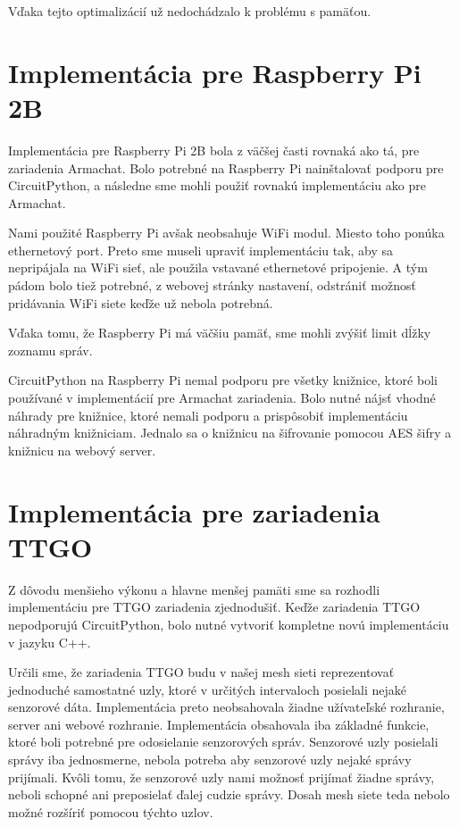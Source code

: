 \documentclass[slovak,master]{diploma}
\begin{document}
Vďaka tejto optimalizácií už nedochádzalo k problému s pamäťou.

\section{Implementácia pre Raspberry Pi 2B}
Implementácia pre Raspberry Pi 2B bola z väčšej časti rovnaká ako tá, pre zariadenia Armachat. Bolo potrebné na Raspberry Pi nainštalovať podporu pre 
CircuitPython, a následne sme mohli použiť rovnakú implementáciu ako pre Armachat.

Nami použité Raspberry Pi avšak neobsahuje WiFi modul. Miesto toho ponúka ethernetový port. Preto sme museli upraviť implementáciu tak, 
aby sa nepripájala na WiFi sieť, ale použila vstavané ethernetové pripojenie. A tým pádom bolo tiež potrebné, z webovej stránky nastavení, odstrániť možnosť 
pridávania WiFi siete keďže už nebola potrebná.

Vďaka tomu, že Raspberry Pi má väčšiu pamäť, sme mohli zvýšiť limit dĺžky zoznamu správ.

CircuitPython na Raspberry Pi nemal podporu pre všetky knižnice, ktoré boli používané v implementácií pre Armachat zariadenia. Bolo nutné nájsť vhodné náhrady pre 
knižnice, ktoré nemali podporu a prispôsobiť implementáciu náhradným knižniciam. Jednalo sa o knižnicu na šifrovanie pomocou AES šifry a knižnicu na webový server. 

\section{Implementácia pre zariadenia TTGO}
Z dôvodu menšieho výkonu a hlavne menšej pamäti sme sa rozhodli implementáciu pre TTGO zariadenia zjednodušiť. Keďže zariadenia TTGO nepodporujú 
CircuitPython, bolo nutné vytvoriť kompletne novú implementáciu v jazyku C++.

Určili sme, že zariadenia TTGO budu v našej mesh sieti reprezentovať jednoduché samostatné uzly, ktoré v určitých intervaloch posielali nejaké senzorové dáta. Implementácia preto 
neobsahovala žiadne užívateľské rozhranie, server ani webové rozhranie. Implementácia obsahovala iba základné funkcie, ktoré boli potrebné pre 
odosielanie senzorových správ. Senzorové uzly posielali správy iba jednosmerne, nebola potreba aby senzorové uzly nejaké správy prijímali. 
Kvôli tomu, že senzorové uzly nami možnosť prijímať žiadne správy, neboli schopné ani preposielať ďalej cudzie správy. Dosah mesh siete teda nebolo možné 
rozšíriť pomocou týchto uzlov.
\end{document}
